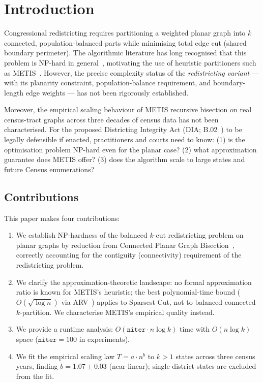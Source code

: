 \section{Introduction}
\label{sec:intro}

Congressional redistricting requires partitioning a weighted planar graph
into $k$ connected, population-balanced parts while minimising total edge
cut (shared boundary perimeter).
The algorithmic literature has long recognised that this problem is NP-hard
in general~\citep{garey1979computers,garey1976simplified}, motivating the
use of heuristic partitioners such as METIS~\citep{karypis1998}.
However, the precise complexity status of the \emph{redistricting variant}
--- with its planarity constraint, population-balance requirement, and
boundary-length edge weights --- has not been rigorously established.

Moreover, the empirical scaling behaviour of METIS recursive bisection on
real census-tract graphs across three decades of census data has not been
characterised.  For the proposed Districting Integrity Act (DIA; B.02~\citep{b02paper}) to be legally
defensible if enacted, practitioners and courts need to know: (1) is the optimisation
problem NP-hard even for the planar case? (2) what approximation guarantee
does METIS offer? (3) does the algorithm scale to large states and future
Census enumerations?

\subsection*{Contributions}

This paper makes four contributions:

\begin{enumerate}
  \item We establish NP-hardness of the balanced $k$-cut redistricting
    problem on planar graphs by reduction from Connected Planar Graph
    Bisection~\citep{dyer1985partitioning}, correctly accounting for the
    contiguity (connectivity) requirement of the redistricting problem.
  \item We clarify the approximation-theoretic landscape: no formal
    approximation ratio is known for METIS's heuristic; the best
    polynomial-time bound ($O(\sqrt{\log n})$ via ARV~\citep{arora2009expander})
    applies to Sparsest Cut, not to balanced connected $k$-partition.
    We characterise METIS's empirical quality instead.
  \item We provide a runtime analysis: $O(\texttt{niter} \cdot n \log k)$
    time with $O(n \log k)$ space ($\texttt{niter} = 100$ in experiments).
  \item We fit the empirical scaling law $T = a \cdot n^b$ to $k > 1$
    states across three census years, finding $b = 1.07 \pm 0.03$
    (near-linear); single-district states are excluded from the fit.
\end{enumerate}

